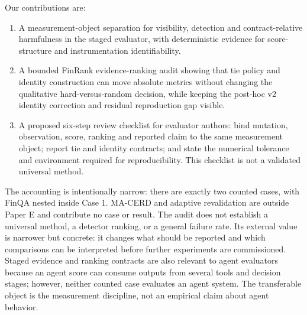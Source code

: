 \documentclass[a4paper,twoside]{article}
\begin{document}
Our contributions are:
\begin{enumerate}
\item A measurement-object separation for visibility, detection and contract-relative harmfulness in the staged evaluator, with deterministic evidence for score-structure and instrumentation identifiability.
\item A bounded FinRank evidence-ranking audit showing that tie policy and identity construction can move absolute metrics without changing the qualitative hard-versus-random decision, while keeping the post-hoc v2 identity correction and residual reproduction gap visible.
\item A proposed six-step review checklist for evaluator authors: bind mutation, observation, score, ranking and reported claim to the same measurement object; report tie and identity contracts; and state the numerical tolerance and environment required for reproducibility. This checklist is not a validated universal method.
\end{enumerate}
The accounting is intentionally narrow: there are exactly two counted cases, with FinQA nested inside Case 1. MA-CERD and adaptive revalidation are outside Paper E and contribute no case or result. The audit does not establish a universal method, a detector ranking, or a general failure rate. Its external value is narrower but concrete: it changes what should be reported and which comparisons can be interpreted before further experiments are commissioned.
Staged evidence and ranking contracts are also relevant to agent evaluators because an agent score can consume outputs from several tools and decision stages; however, neither counted case evaluates an agent system. The transferable object is the measurement discipline, not an empirical claim about agent behavior.
\end{document}
